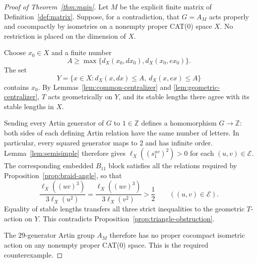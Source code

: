 \begin{proof}[Proof of Theorem~\ref{thm:main}]
Let $M$ be the explicit finite matrix of Definition~\ref{def:matrix}.
Suppose, for a contradiction, that $G=A_M$ acts properly and
cocompactly by isometries on a nonempty proper CAT(0) space $X$.
No restriction is placed on the dimension of $X$.

Choose $x_0\in X$ and a finite number
\[
 A\ge\max\{d_X(x_0,dx_0),d_X(x_0,ex_0)\}.
\]
The set
\[
 Y=\{x\in X:d_X(x,dx)\le A,\ d_X(x,ex)\le A\}
\]
contains $x_0$.  By Lemmas~\ref{lem:common-centralizer} and
\ref{lem:geometric-centralizer}, $T$ acts geometrically on $Y$,
and its stable lengths there agree with its stable lengths in $X$.

Sending every Artin generator of $G$ to $1\in\mathbb Z$ defines
a homomorphism $G\to\mathbb Z$: both sides of each defining
Artin relation have the same number of letters.  In particular,
every squared generator maps to $2$ and has infinite order.
Lemma~\ref{lem:semisimple} therefore gives
$\ell_X((s_1^{uv})^2)>0$ for each $(u,v)\in\mathcal E$.
The corresponding embedded $B_{11}$ block satisfies all the
relations required by Proposition~\ref{prop:braid-angle}, so that
\[
 \frac{\ell_X((uv)^3)}{3\ell_X(u^2)}
 =\frac{\ell_X((uv)^3)}{3\ell_X(v^2)}
 >\frac12
 \qquad ((u,v)\in\mathcal E).
\]
Equality of stable lengths transfers all three strict inequalities
to the geometric $T$-action on $Y$.  This contradicts
Proposition~\ref{prop:triangle-obstruction}.

The $29$-generator Artin group $A_M$ therefore has no proper
cocompact isometric action on any nonempty proper CAT(0) space.
This is the required counterexample.
\end{proof}
